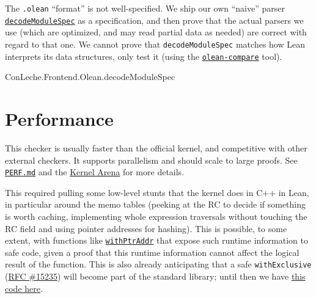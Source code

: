\documentclass{article}
\newcommand\code[1]{\texttt{#1}}
\begin{document}
The \code{.olean} “format” is not well-specified. We ship our own “naive” parser \href{https://github.com/leanprover/con-leche/blob/master/ConLeche/Frontend/Olean/View.lean#L81}{\code{decodeModuleSpec}} as a specification, and then prove that the actual parsers we use (which are optimized, and may read partial data as needed) are correct with regard to that one. We cannot prove that \code{decodeModuleSpec} matches how Lean interprets its data structures, only test it (using the \href{https://github.com/leanprover/con-leche/blob/master/OleanCompare.lean}{\code{olean-compare}} tool).

\begin{leanblock}[view=lean, sum=iVnydHMawr]{ConLeche.Frontend.Olean.decodeModuleSpec}{}
\end{leanblock}

\section*{Performance}

This checker is usually faster than the official kernel, and competitive with other external checkers. It supports parallelism and should scale to large proofs. See \href{https://github.com/leanprover/con-leche/blob/master/PERF.md}{\code{PERF.md}} and the \href{https://arena.lean-lang.org/}{Kernel Arena} for more details.

This required pulling some low-level stunts that the kernel does in C++ in Lean, in particular around the memo tables (peeking at the RC to decide if something is worth caching, implementing whole expression traversals without touching the RC field and using pointer addresses for hashing). This is possible, to some extent, with functions like \href{https://leanprover-community.github.io/mathlib4_docs/Init/Util.html#withPtrAddr}{\code{withPtrAddr}} that expose such runtime information to safe code, given a proof that this runtime information cannot affect the logical result of the function. This is also already anticipating that a safe \code{withExclusive} (\href{https://github.com/leanprover/lean4/issues/15235}{RFC \#15235}) will become part of the standard library; until then we have \href{https://github.com/leanprover/con-leche/blob/master/ConLeche/Kernel/Exclusive.lean}{this code here}.
\end{document}

